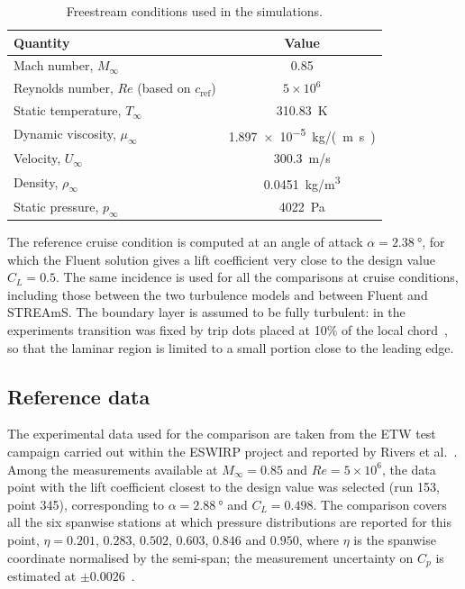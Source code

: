\begin{table}[htbp]
  \centering
  \caption{Freestream conditions used in the simulations.}
  \label{tab:val_flowconditions}
  \begin{tabular}{lc}
    \hline
    Quantity & Value \\
    \hline
    Mach number, $M_\infty$ & 0.85 \\
    Reynolds number, $Re$ (based on $c_\mathrm{ref}$) & $5\times10^{6}$ \\
    Static temperature, $T_\infty$ & \SI{310.83}{K} \\
    Dynamic viscosity, $\mu_\infty$ & \SI{1.897e-5}{kg/(m.s)} \\
    Velocity, $U_\infty$ & \SI{300.3}{m/s} \\
    Density, $\rho_\infty$ & \SI{0.0451}{kg/m^3} \\
    Static pressure, $p_\infty$ & \SI{4022}{Pa} \\
    \hline
  \end{tabular}
\end{table}

The reference cruise condition is computed at an angle of attack $\alpha = \SI{2.38}{\degree}$, for which the Fluent solution gives a lift coefficient very close to the design value $C_L = 0.5$. The same incidence is used for all the comparisons at cruise conditions, including those between the two turbulence models and between Fluent and STREAmS. The boundary layer is assumed to be fully turbulent: in the experiments transition was fixed by trip dots placed at 10\% of the local chord~\cite{rivers2015}, so that the laminar region is limited to a small portion close to the leading edge.

\subsection{Reference data}
\label{sec:val_refdata}

The experimental data used for the comparison are taken from the ETW test campaign carried out within the ESWIRP project and reported by Rivers et al.~\cite{rivers2015}. Among the measurements available at $M_\infty = 0.85$ and $Re = 5\times10^{6}$, the data point with the lift coefficient closest to the design value was selected (run 153, point 345), corresponding to $\alpha = \SI{2.88}{\degree}$ and $C_L = 0.498$. The comparison covers all the six spanwise stations at which pressure distributions are reported for this point, $\eta = 0.201$, $0.283$, $0.502$, $0.603$, $0.846$ and $0.950$, where $\eta$ is the spanwise coordinate normalised by the semi-span; the measurement uncertainty on $C_p$ is estimated at $\pm 0.0026$~\cite{rivers2015}.

